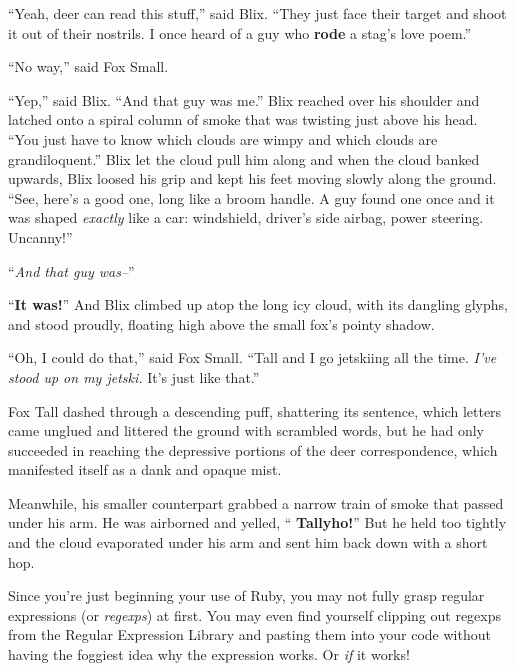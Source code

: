 \documentclass[12pt,twoside]{report}
\begin{document}
``Yeah, deer can read this stuff,'' said Blix.  ``They just face their
target and shoot it out of their nostrils.  I once heard of a guy who
{\bf rode} a stag's love poem.''

``No way,'' said Fox Small.

``Yep,'' said Blix.  ``And that guy was me.''  Blix reached over his
shoulder and latched onto a spiral column of smoke that was twisting
just above his head.  ``You just have to know which clouds are wimpy
and which clouds are grandiloquent.''  Blix let the cloud pull him
along and when the cloud banked upwards, Blix loosed his grip and kept
his feet moving slowly along the ground.  ``See, here's a good one,
long like a broom handle.  A guy found one once and it was shaped {\em
  exactly} like a car: windshield, driver's side airbag, power
steering. Uncanny!''

``{\em And that guy was--}''

``{\bf It was!}''  And Blix climbed up atop the long icy cloud, with
its dangling glyphs, and stood proudly, floating high above the small
fox's pointy shadow.

``Oh, I could do that,'' said Fox Small.  ``Tall and I go jetskiing
all the time.  {\em I've stood up on my jetski.}  It's just like
that.''

Fox Tall dashed through a descending puff, shattering its sentence,
which letters came unglued and littered the ground with scrambled
words, but he had only succeeded in reaching the depressive portions
of the deer correspondence, which manifested itself as a dank and
opaque mist.

Meanwhile, his smaller counterpart grabbed a narrow train of smoke
that passed under his arm.  He was airborned and yelled, ``{\bf
  Tallyho!}''  But he held too tightly and the cloud evaporated under
his arm and sent him back down with a short hop.

Since you're just beginning your use of Ruby, you may not fully grasp
regular expressions (or {\em regexps}) at first.  You may even find
yourself clipping out regexps from the Regular Expression Library and
pasting them into your code without having the foggiest idea why the
expression works.  Or {\em if} it works!


\end{document}
